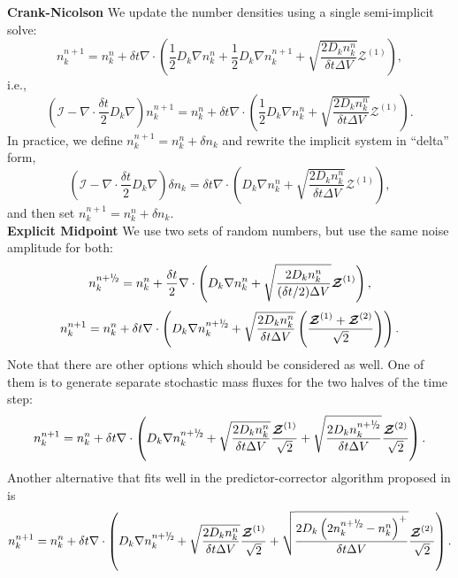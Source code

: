 \documentclass[final]{siamltex}
\def\mZb {\bm{\mathcal{Z}}}
\def\half   {\frac{1}{2}}
\def\myhalf {\sfrac{1}{2}}
\newcommand{\sfrac}[2]{\mathchoice
  {\kern0em\raise.5ex\hbox{\the\scriptfont0 #1}\kern-.15em/
   \kern-.15em\lower.25ex\hbox{\the\scriptfont0 #2}}
  {\kern0em\raise.5ex\hbox{\the\scriptfont0 #1}\kern-.15em/
   \kern-.15em\lower.25ex\hbox{\the\scriptfont0 #2}}
  {\kern0em\raise.5ex\hbox{\the\scriptscriptfont0 #1}\kern-.2em/
   \kern-.15em\lower.25ex\hbox{\the\scriptscriptfont0 #2}}
  {#1\!/#2}}
\begin{document}
{\bf Crank-Nicolson}
We update the number densities using a single semi-implicit solve:
\begin{equation}
n_k^{n+1} = n_k^n + \delta t\nabla\cdot\left(
\half D_k\nabla n_k^n + \half D_k\nabla n_k^{n+1}
+ \sqrt{\frac{2 D_k n_k^n}{\delta t\Delta V}}\mZb^{(1)}
\right),
\end{equation}
i.e.,
\begin{equation}
\left(\mathcal{I} - \nabla\cdot\frac{\delta t}{2}D_k\nabla\right)n_k^{n+1} = 
n_k^n + \delta t\nabla\cdot\left(\half D_k\nabla n_k^n
+ \sqrt{\frac{2 D_k n_k^n}{\delta t\Delta V}}\mZb^{(1)}\right).
\end{equation}
In practice, we define $n_k^{n+1} = n_k^n + \delta n_k$ and rewrite the implicit
system in ``delta'' form,
\begin{equation}
\left(\mathcal{I} - \nabla\cdot\frac{\delta t}{2}D_k\nabla\right)\delta n_k = 
\delta t\nabla\cdot\left(D_k\nabla n_k^n + \sqrt{\frac{2 D_k n_k^n}{\delta t\Delta V}}\mZb^{(1)}\right),
\end{equation}
and then set $n_k^{n+1} = n_k^n + \delta n_k$.\\

{\bf Explicit Midpoint}
We use two sets of random numbers, but use the same noise amplitude for both:
\begin{equation}
n_k^{n+\myhalf} = n_k^n + \frac{\delta t}{2} \nabla\cdot\left(D_k\nabla n_k^n
+ \sqrt{\frac{2 D_k n_k^n}{(\delta t/2)\Delta V}}\mZb^{(1)}\right),
\end{equation}
\begin{equation}
n_k^{n+1} = n_k^n + \delta t\nabla\cdot\left(
D_k\nabla n_k^{n+\myhalf}
+ \sqrt{\frac{2 D_k n_k^n}{\delta t\Delta V}}\left(\frac{\mZb^{(1)}+\mZb^{(2)}}{\sqrt{2}}\right)
\right).
\end{equation}
Note that there are other options which should be considered as well. One of them is to generate separate
stochastic mass fluxes for the two halves of the time step:
\begin{equation}
n_k^{n+1} = n_k^n + \delta t\nabla\cdot\left(
D_k\nabla n_k^{n+\myhalf}
+ \sqrt{\frac{2 D_k n_k^n}{\delta t\Delta V}} \frac{\mZb^{(1)}}{\sqrt{2}}
+ \sqrt{\frac{2 D_k n_k^{n+\myhalf}}{\delta t\Delta V}} \frac{\mZb^{(2)}}{\sqrt{2}}\right).
\end{equation}
Another alternative that fits well in the predictor-corrector algorithm proposed in \cite{AndersonMattingly2011}
is
\begin{equation}
n_k^{n+1} = n_k^n + \delta t\nabla\cdot\left(
D_k\nabla n_k^{n+\myhalf}
+ \sqrt{\frac{2 D_k n_k^n}{\delta t\Delta V}} \frac{\mZb^{(1)}}{\sqrt{2}}
+ \sqrt{\frac{2 D_k \left( 2 n_k^{n+\myhalf} - n_k^n \right)^+ }{\delta t\Delta V}} \frac{\mZb^{(2)}}{\sqrt{2}}\right).
\end{equation}
\end{document}
